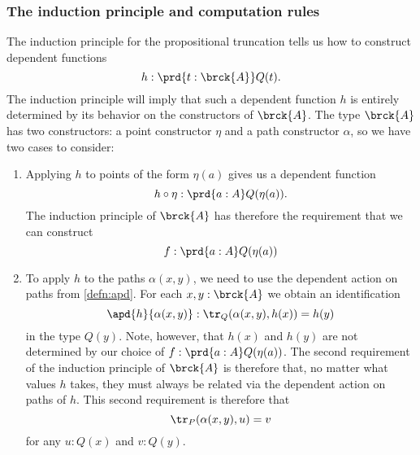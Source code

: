 \subsubsection{The induction principle and computation rules}
The induction principle for the propositional truncation tells us how to construct dependent functions
\begin{equation*}
  h:\prd{t:\brck{A}}Q(t).
\end{equation*}
The induction principle will imply that such a dependent function $h$ is entirely determined by its behavior on the constructors of $\brck{A}$. The type $\brck{A}$ has two constructors: a point constructor $\eta$ and a path constructor $\alpha$, so we have two cases to consider:
\begin{enumerate}
\item Applying $h$ to points of the form $\eta(a)$ gives us a dependent function
  \begin{equation*}
    h\circ \eta : \prd{a:A}Q(\eta(a)).
  \end{equation*}
  The induction principle of $\brck{A}$ has therefore the requirement that we can construct
  \begin{equation*}
    f:\prd{a:A}Q(\eta(a))
  \end{equation*}
\item To apply $h$ to the paths $\alpha(x,y)$, we need to use the dependent action on paths from \cref{defn:apd}. For each $x,y:\brck{A}$ we obtain an identification
  \begin{equation*}
    \apd{h}{\alpha(x,y)}:\tr_Q(\alpha(x,y),h(x))=h(y)
  \end{equation*}
  in the type $Q(y)$. Note, however, that $h(x)$ and $h(y)$ are not determined by our choice of $f:\prd{a:A}Q(\eta(a))$. The second requirement of the induction principle of $\brck{A}$ is therefore that, no matter what values $h$ takes, they must always be related via the dependent action on paths of $h$. This second requirement is therefore that
  \begin{equation*}
    \tr_P(\alpha(x,y),u)=v
  \end{equation*}
  for any $u:Q(x)$ and $v:Q(y)$. 
\end{enumerate}

